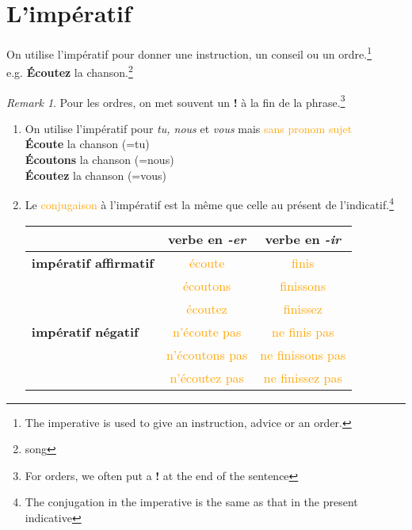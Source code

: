 \documentclass[math,code]{amznotes}
\theoremstyle{remark}
\newtheorem*{remark}{Remark}
\begin{document}
\section{L'impératif}
On utilise l'impératif pour donner une instruction, un conseil ou un ordre.\footnote{The imperative is used to give an instruction, advice or an order.} \\
e.g. \textbf{Écoutez} la chanson.\footnote{song}
\begin{notebox}
    \begin{remark}
        Pour les ordres, on met souvent un \textbf{!} à la fin de la phrase.\footnote{For orders, we often put a \textbf{!} at the end of the sentence}
    \end{remark}
\end{notebox}
\begin{enumerate}
    \item On utilise l'impératif pour \textit{tu, nous} et \textit{vous} mais \textcolor{orange}{sans pronom sujet} \\
    \textbf{Écoute} la chanson (=tu)\\
    \textbf{Écoutons} la chanson (=nous) \\
    \textbf{Écoutez} la chanson (=vous)
    \item Le \textcolor{orange}{conjugaison} à l'impératif est la même que celle au présent de l'indicatif.\footnote{The conjugation in the imperative is the same as that in the present indicative}
    \begin{table}[H]
        \centering
        \renewcommand{\arraystretch}{1.5}
        \begin{tabular}{|l|c|c|}
            \hline
             & \textbf{verbe en \textit{-er}} & \textbf{verbe en \textit{-ir}} \\
            \hline
            \textbf{impératif affirmatif} & \textcolor{orange}{écoute} & \textcolor{orange}{finis} \\ 
             & \textcolor{orange}{écoutons} & \textcolor{orange}{finissons} \\ 
             & \textcolor{orange}{écoutez} & \textcolor{orange}{finissez} \\ 
            \hline
            \textbf{impératif négatif} & \textcolor{orange}{n'écoute pas} & \textcolor{orange}{ne finis pas} \\ 
             & \textcolor{orange}{n'écoutons pas} & \textcolor{orange}{ne finissons pas} \\ 
             & \textcolor{orange}{n'écoutez pas} & \textcolor{orange}{ne finissez pas} \\ 

\end{tabular}
\end{table}
\end{enumerate}
\end{document}
